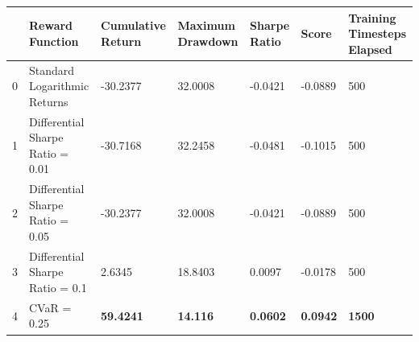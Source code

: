 \begin{tabular}{lllllll}
\toprule
 & Reward Function & Cumulative Return & Maximum Drawdown & Sharpe Ratio & Score & Training Timesteps Elapsed \\
\midrule
0 & Standard Logarithmic Returns & -30.2377 & 32.0008 & -0.0421 & -0.0889 & 500 \\
1 & Differential Sharpe Ratio = 0.01 & -30.7168 & 32.2458 & -0.0481 & -0.1015 & 500 \\
2 & Differential Sharpe Ratio = 0.05 & -30.2377 & 32.0008 & -0.0421 & -0.0889 & 500 \\
3 & Differential Sharpe Ratio = 0.1 & 2.6345 & 18.8403 & 0.0097 & -0.0178 & 500 \\
4 & CVaR = 0.25 & \textbf{59.4241} & \textbf{14.116} & \textbf{0.0602} & \textbf{0.0942} & \textbf{1500} \\
\bottomrule
\end{tabular}
